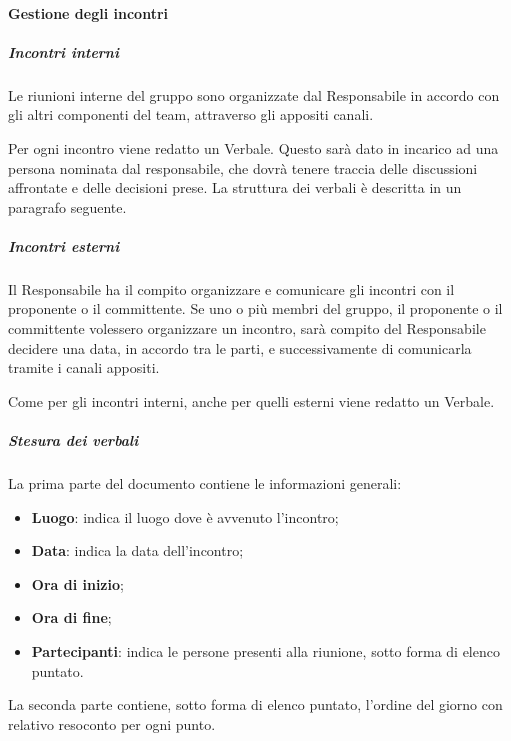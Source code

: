    		
   		
   	\paragraph{Gestione degli incontri}
   	
   		\subparagraph*{Incontri interni}
   		Le riunioni interne del gruppo sono organizzate dal Responsabile in accordo con gli altri componenti del team, attraverso gli appositi canali.
   		
   		\noindent Per ogni incontro viene redatto un Verbale. Questo sarà dato in incarico ad una persona nominata dal responsabile, che dovrà tenere traccia delle discussioni affrontate e delle decisioni prese. La struttura dei verbali è descritta in un paragrafo seguente.
   		
   		\subparagraph*{Incontri esterni}
   		Il Responsabile ha il compito organizzare e comunicare gli incontri con il proponente o il committente. Se uno o più membri del gruppo, il proponente o il committente volessero organizzare un incontro, sarà compito del Responsabile decidere una data, in accordo tra le parti, e successivamente di comunicarla tramite i canali appositi.
   		
   		\noindent Come per gli incontri interni, anche per quelli esterni viene redatto un Verbale.
   		\subparagraph*{Stesura dei verbali}
   		La prima parte del documento contiene le informazioni generali:
   		\begin{itemize}
   			\item \textbf{Luogo}: indica il luogo dove è avvenuto l'incontro;
   			\item \textbf{Data}: indica la data dell'incontro;
   			\item \textbf{Ora di inizio};
   			\item \textbf{Ora di fine};
   			\item \textbf{Partecipanti}: indica le persone presenti alla riunione, sotto forma di elenco puntato.
   		\end{itemize}
   		La seconda parte contiene, sotto forma di elenco puntato, l'ordine del giorno con relativo resoconto per ogni punto.
   	
